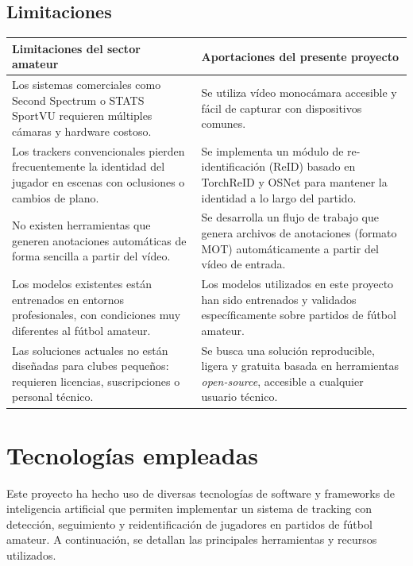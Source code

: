\documentclass[12pt, a4paper, twoside]{article}
\begin{document}
	\subsection{Limitaciones}
	
	\begin{center}
		\begin{tabular}{|p{6.5cm}|p{6.5cm}|}
			\hline
			\textbf{Limitaciones del sector amateur} & \textbf{Aportaciones del presente proyecto} \\
			\hline
			Los sistemas comerciales como Second Spectrum o STATS SportVU requieren múltiples cámaras y hardware costoso. &
			Se utiliza vídeo monocámara accesible y fácil de capturar con dispositivos comunes. \\
			\hline
			Los trackers convencionales pierden frecuentemente la identidad del jugador en escenas con oclusiones o cambios de plano. &
			Se implementa un módulo de re-identificación (ReID) basado en TorchReID y OSNet para mantener la identidad a lo largo del partido. \\
			\hline
			No existen herramientas que generen anotaciones automáticas de forma sencilla a partir del vídeo. &
			Se desarrolla un flujo de trabajo que genera archivos de anotaciones (formato MOT) automáticamente a partir del vídeo de entrada. \\
			\hline
			Los modelos existentes están entrenados en entornos profesionales, con condiciones muy diferentes al fútbol amateur. &
			Los modelos utilizados en este proyecto han sido entrenados y validados específicamente sobre partidos de fútbol amateur. \\
			\hline
			Las soluciones actuales no están diseñadas para clubes pequeños: requieren licencias, suscripciones o personal técnico. &
			Se busca una solución reproducible, ligera y gratuita basada en herramientas \textit{open-source}, accesible a cualquier usuario técnico. \\
			\hline
		\end{tabular}
	\end{center}
	
	\section{Tecnologías empleadas}
	
	Este proyecto ha hecho uso de diversas tecnologías de software y frameworks de inteligencia artificial que permiten implementar un sistema de tracking con detección, seguimiento y reidentificación de jugadores en partidos de fútbol amateur. A continuación, se detallan las principales herramientas y recursos utilizados.
	
\end{document}

